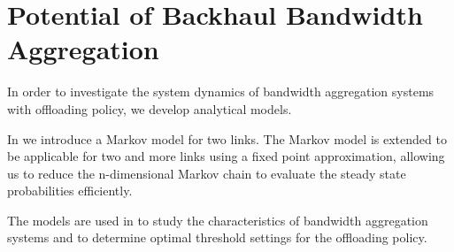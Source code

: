 \section{Potential of Backhaul Bandwidth Aggregation}\label{sec:aggregation:model}

In order to investigate the system dynamics of bandwidth aggregation systems with offloading policy, we develop analytical models.

In  we introduce a Markov model for two links. The Markov model is extended to be applicable for two and more links using a fixed point approximation, allowing us to reduce the n-dimensional Markov chain to evaluate the steady state probabilities efficiently.

The models are used in  to study the characteristics of bandwidth aggregation systems and to determine optimal threshold settings for the offloading policy.



